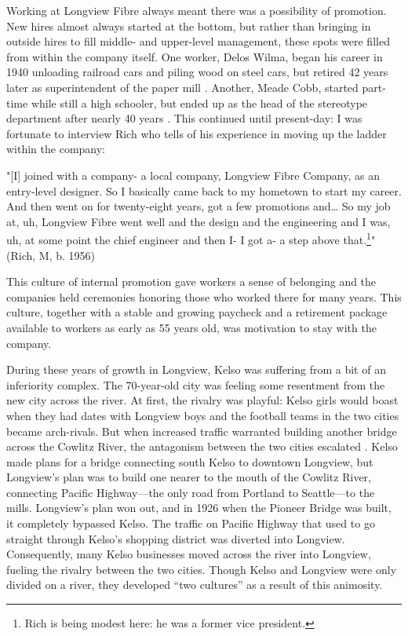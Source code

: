 Working at Longview Fibre always meant there was a possibility of promotion. New hires almost always started at the bottom, but rather than bringing in outside hires to fill middle- and upper-level management, these spots were filled from within the company itself. One worker, Delos Wilma, began his career in 1940 unloading railroad cars and piling wood on steel cars, but retired 42 years later as superintendent of the paper mill \citep[105]{wilma_2017}. Another, Meade Cobb, started part-time while still a high schooler, but ended up as the head of the stereotype department after nearly 40 years \citep[133]{wilma_2017}. This continued until present-day: I was fortunate to interview Rich who tells of his experience in moving up the ladder within the company:
\begin{num_quote}
    "[I] joined with a company- a local company, Longview Fibre Company, as an entry-level designer. So I basically came back to my hometown to start my career. And then went on for twenty-eight years, got a few promotions and… So my job at, uh, Longview Fibre went well and the design and the engineering and I was, uh, at some point the chief engineer and then I- I got a- a step above that.\footnote{Rich is being modest here: he was a former vice president.}" (Rich, M, b. 1956)
    \label{quote:moving_up_coorporate_ladder}
\end{num_quote}
This culture of internal promotion gave workers a sense of belonging and the companies held ceremonies honoring those who worked there for many years. This culture, together with a stable and growing paycheck and a retirement package available to workers as early as 55 years old, was motivation to stay with the company.

During these years of growth in Longview, Kelso was suffering from a bit of an inferiority complex. The 70-year-old city was feeling some resentment from the new city across the river. At first, the rivalry was playful: Kelso girls would boast when they had dates with Longview boys and the football teams in the two cities became arch-rivals. But when increased traffic warranted building another bridge across the Cowlitz River, the antagonism between the two cities escalated \citep[154-155]{urrutia_1998}. Kelso made plans for a bridge connecting south Kelso to downtown Longview, but Longview's plan was to build one nearer to the mouth of the Cowlitz River, connecting Pacific Highway---the only road from Portland to Seattle—to the mills. Longview's plan won out, and in 1926 when the Pioneer Bridge was built, it completely bypassed Kelso. The traffic on Pacific Highway that used to go straight through Kelso's shopping district was diverted into Longview. Consequently, many Kelso businesses moved across the river into Longview, fueling the rivalry between the two cities. Though Kelso and Longview were only divided on a river, they developed “two cultures” \citep[xi]{wilma_2017} as a result of this animosity.

